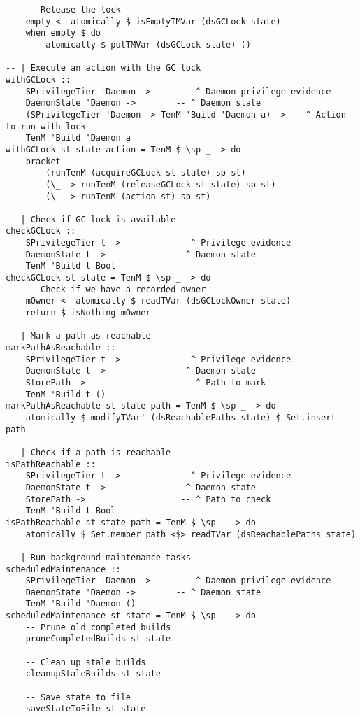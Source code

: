 \documentclass{article}
\begin{document}
\begin{tcolorbox}[title=Ten/Daemon/State.hs Changes]
\begin{verbatim}
    -- Release the lock
    empty <- atomically $ isEmptyTMVar (dsGCLock state)
    when empty $ do
        atomically $ putTMVar (dsGCLock state) ()

-- | Execute an action with the GC lock
withGCLock ::
    SPrivilegeTier 'Daemon ->      -- ^ Daemon privilege evidence
    DaemonState 'Daemon ->        -- ^ Daemon state
    (SPrivilegeTier 'Daemon -> TenM 'Build 'Daemon a) -> -- ^ Action to run with lock
    TenM 'Build 'Daemon a
withGCLock st state action = TenM $ \sp _ -> do
    bracket
        (runTenM (acquireGCLock st state) sp st)
        (\_ -> runTenM (releaseGCLock st state) sp st)
        (\_ -> runTenM (action st) sp st)

-- | Check if GC lock is available
checkGCLock ::
    SPrivilegeTier t ->           -- ^ Privilege evidence
    DaemonState t ->             -- ^ Daemon state
    TenM 'Build t Bool
checkGCLock st state = TenM $ \sp _ -> do
    -- Check if we have a recorded owner
    mOwner <- atomically $ readTVar (dsGCLockOwner state)
    return $ isNothing mOwner

-- | Mark a path as reachable
markPathAsReachable ::
    SPrivilegeTier t ->           -- ^ Privilege evidence
    DaemonState t ->             -- ^ Daemon state
    StorePath ->                   -- ^ Path to mark
    TenM 'Build t ()
markPathAsReachable st state path = TenM $ \sp _ -> do
    atomically $ modifyTVar' (dsReachablePaths state) $ Set.insert path

-- | Check if a path is reachable
isPathReachable ::
    SPrivilegeTier t ->           -- ^ Privilege evidence
    DaemonState t ->             -- ^ Daemon state
    StorePath ->                   -- ^ Path to check
    TenM 'Build t Bool
isPathReachable st state path = TenM $ \sp _ -> do
    atomically $ Set.member path <$> readTVar (dsReachablePaths state)

-- | Run background maintenance tasks
scheduledMaintenance ::
    SPrivilegeTier 'Daemon ->      -- ^ Daemon privilege evidence
    DaemonState 'Daemon ->        -- ^ Daemon state
    TenM 'Build 'Daemon ()
scheduledMaintenance st state = TenM $ \sp _ -> do
    -- Prune old completed builds
    pruneCompletedBuilds st state

    -- Clean up stale builds
    cleanupStaleBuilds st state

    -- Save state to file
    saveStateToFile st state


\end{verbatim}
\end{tcolorbox}
\end{document}
